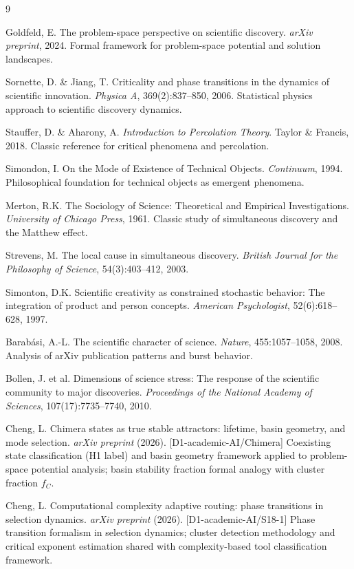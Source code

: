 \documentclass[12pt]{article}
\begin{document}
\begin{thebibliography}{9}

Goldfeld, E.
The problem-space perspective on scientific discovery.
\textit{arXiv preprint}, 2024.
Formal framework for problem-space potential and solution landscapes.

Sornette, D. \& Jiang, T.
Criticality and phase transitions in the dynamics of scientific innovation.
\textit{Physica A}, 369(2):837--850, 2006.
Statistical physics approach to scientific discovery dynamics.

Stauffer, D. \& Aharony, A.
\textit{Introduction to Percolation Theory}.
Taylor \& Francis, 2018.
Classic reference for critical phenomena and percolation.

Simondon, I.
On the Mode of Existence of Technical Objects.
\textit{Continuum}, 1994.
Philosophical foundation for technical objects as emergent phenomena.

Merton, R.K.
The Sociology of Science: Theoretical and Empirical Investigations.
\textit{University of Chicago Press}, 1961.
Classic study of simultaneous discovery and the Matthew effect.

Strevens, M.
The local cause in simultaneous discovery.
\textit{British Journal for the Philosophy of Science}, 54(3):403--412, 2003.

Simonton, D.K.
Scientific creativity as constrained stochastic behavior: The integration of product and person concepts.
\textit{American Psychologist}, 52(6):618--628, 1997.

Barab\'asi, A.-L.
The scientific character of science.
\textit{Nature}, 455:1057--1058, 2008.
Analysis of arXiv publication patterns and burst behavior.

Bollen, J. et al.
Dimensions of science stress: The response of the scientific community to major discoveries.
\textit{Proceedings of the National Academy of Sciences}, 107(17):7735--7740, 2010.

Cheng, L. Chimera states as true stable attractors: lifetime, basin geometry, and mode selection.
\textit{arXiv preprint} (2026). [D1-academic-AI/Chimera]
\newblock Coexisting state classification (H1 label) and basin geometry framework applied to problem-space potential analysis; basin stability fraction formal analogy with cluster fraction $f_C$.

Cheng, L. Computational complexity adaptive routing: phase transitions in selection dynamics.
\textit{arXiv preprint} (2026). [D1-academic-AI/S18-1]
\newblock Phase transition formalism in selection dynamics; cluster detection methodology and critical exponent estimation shared with complexity-based tool classification framework.

\end{thebibliography}
\end{document}
